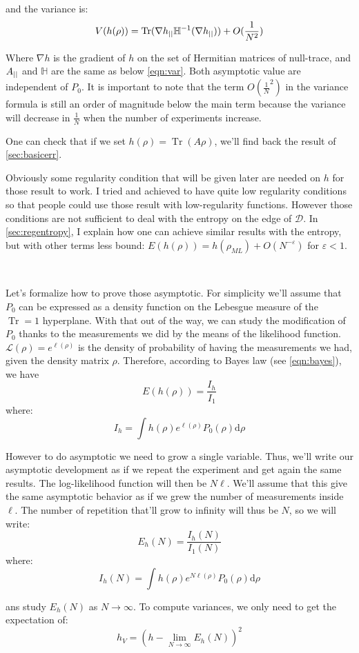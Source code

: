 \documentclass[10pt,a4paper]{report}
\theoremstyle{plain}
\theoremstyle{definition}
\theoremstyle{remark}
\newcommand{\dd}{\mathrm{d}}
\DeclareMathOperator{\Tr}{Tr}
\newcommand{\ml}{_{M\!L}}
\begin{document}
and the variance is:
\[V(h(\rho)) = \Tr(\nabla h\pr \mathbb H\inv(\nabla h\pr)) +O(\frac 1 {N^2})\]

Where $\nabla h$ is the gradient of $h$ on the set of Hermitian
matrices of null-trace, and $A_{||}$ and $\mathbb H$ are the same as below
\cref{eqn:var}. Both asymptotic value are independent of $P_0$. It is important
to note that the term $O(\frac 1 N^2)$ in the variance formula
is still an order of magnitude below
the main term because the variance will decrease in $\frac 1 N$ when the number
of experiments increase.

One can check that if we set
$h(\rho) = \Tr(A\rho)$, we'll find back the result of \cref{sec:basicerr}.

Obviously some
regularity condition that will be given later are needed on $h$ for those result
to work.
I tried and achieved to have quite low regularity conditions so that people could
use those result with low-regularity functions. However those conditions are not
sufficient to deal with the entropy on the edge of $\mathcal{D}$. In
\cref{sec:regentropy}, I explain how one can achieve similar results with the
entropy, but with other terms less bound: $E(h(\rho)) = h(\rho\ml) +
O(N^{-\varepsilon})$ for $\varepsilon < 1$.

\

Let's formalize how to prove those asymptotic. For simplicity we'll assume that
$P_0$ can be expressed as a density function on the Lebesgue measure of the
$\Tr = 1$ hyperplane. With that out of the way, we can study the modification of
$P_0$ thanks to the measurements we did by the means of the likelihood function.
$\mathcal{L}(\rho) = e^{\ell(\rho)}$ is the density of probability of having
the measurements we had, given the density matrix $\rho$. Therefore, according to
Bayes law (see \cref{eqn:bayes}), we have
\[E(h(\rho)) = \frac{I_h}{I_1}\]
where:
\[I_h = \int h(\rho) e^{\ell(\rho)} P_0(\rho) \dd \rho \]

However to do asymptotic we need to grow a single variable. Thus, we'll write our
asymptotic development as if we repeat the experiment and get again the same
results. The log-likelihood function will then be $N\ell$. We'll assume that this
give the same asymptotic behavior as if we grew the number of measurements inside
$\ell$. The number of repetition that'll grow to infinity will thus be $N$, so we
will write:
\[E_h(N) = \frac{I_h(N)}{I_1(N)}\]
where:
\[I_h(N) = \int h(\rho) e^{N\ell(\rho)} P_0(\rho) \dd \rho \]

ans study $E_h(N)$ as $N \to \infty$. To compute variances, we only need to get
the expectation of:
\[h_V = \left(h - \lim_{N \to \infty} E_h(N)\right)^2\]
\end{document}
